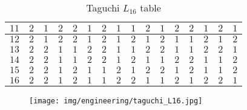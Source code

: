 \begin{itemize}
\begin{table}[H]
\begin{center}
{\begin{tabular}{|c|c|c|c|c|c|c|c|c|c|c|c|c|c|c|c|}
			$11$ & $2$ & $1$ & $2$ & $2$ & $1$ & $2$ & $1$ & $1$ & $2$ & $1$ & $2$ & $2$ & $1$ & $2$ & $1$\\ \hline
			$12$ & $2$ & $1$ & $2$ & $2$ & $1$ & $2$ & $1$ & $2$ & $1$ & $2$ & $1$ & $1$ & $2$ & $1$ & $2$\\ \hline
			$13$ & $2$ & $2$ & $1$ & $1$ & $2$ & $2$ & $1$ & $1$ & $2$ & $2$ & $1$ & $1$ & $2$ & $2$ & $1$\\ \hline
			$14$ & $2$ & $2$ & $1$ & $1$ & $2$ & $2$ & $1$ & $2$ & $1$ & $1$ & $2$ & $2$ & $1$ & $1$ & $2$\\ \hline
			$15$ & $2$ & $2$ & $1$ & $2$ & $1$ & $1$ & $2$ & $1$ & $2$ & $2$ & $1$ & $2$ & $1$ & $1$ & $2$\\ \hline
			$16$ & $2$ & $2$ & $1$ & $2$ & $1$ & $1$ & $2$ & $2$ & $1$ & $1$ & $2$ & $1$ & $2$ & $2$ & $1$\\ \hline
		 	\end{tabular}}
			\end{center}
			\caption{Taguchi $L_{16}$ table}
		\end{table}
		\begin{figure}[H]
			\begin{center}
			\texttt{[image: img/engineering/taguchi\_L16.jpg]}
			\end{center}	
		\end{figure}
		

\end{itemize}
